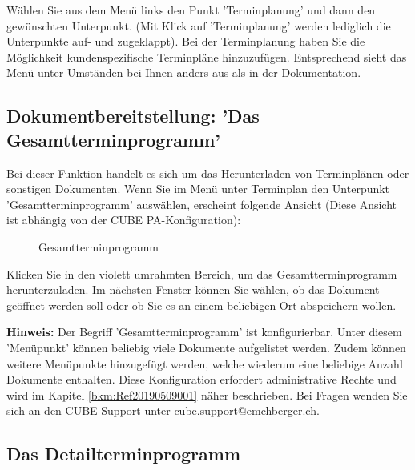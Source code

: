 Wählen Sie aus dem Menü links den Punkt 'Terminplanung' und dann den gewünschten Unterpunkt. (Mit Klick auf 'Terminplanung' werden lediglich die Unterpunkte auf- und zugeklappt). Bei der Terminplanung haben Sie die Möglichkeit kundenspezifische Terminpläne hinzuzufügen. Entsprechend sieht das Menü unter Umständen bei Ihnen anders aus als in der Dokumentation.

\vspace{3.5cm} 

\subsection{Dokumentbereitstellung: 'Das Gesamtterminprogramm'}

Bei dieser Funktion handelt es sich um das Herunterladen von Terminplänen oder sonstigen Dokumenten.\newline
Wenn Sie im Menü unter Terminplan den Unterpunkt 'Gesamtterminprogramm' auswählen, erscheint folgende Ansicht (Diese Ansicht ist abhängig von der CUBE PA-Konfiguration):
\begin{figure}[H]
  \vspace{-20pt}
\caption{Gesamtterminprogramm}
\end{figure}

Klicken Sie in den violett umrahmten Bereich, um das Gesamtterminprogramm herunterzuladen. Im nächsten Fenster können Sie wählen, ob das Dokument geöffnet werden soll oder ob Sie es an einem beliebigen Ort abspeichern wollen.

\vspace{\baselineskip}

\textbf{Hinweis:} Der Begriff 'Gesamtterminprogramm' ist konfigurierbar. Unter diesem 'Menüpunkt' können beliebig viele Dokumente aufgelistet werden. Zudem können weitere Menüpunkte hinzugefügt werden, welche wiederum eine beliebige Anzahl Dokumente enthalten. Diese Konfiguration erfordert administrative Rechte und wird im Kapitel \ref{bkm:Ref20190509001} näher beschrieben. Bei Fragen wenden Sie sich an den CUBE-Support unter {\color{red} cube.support@emchberger.ch}.

\subsection{Das Detailterminprogramm}

